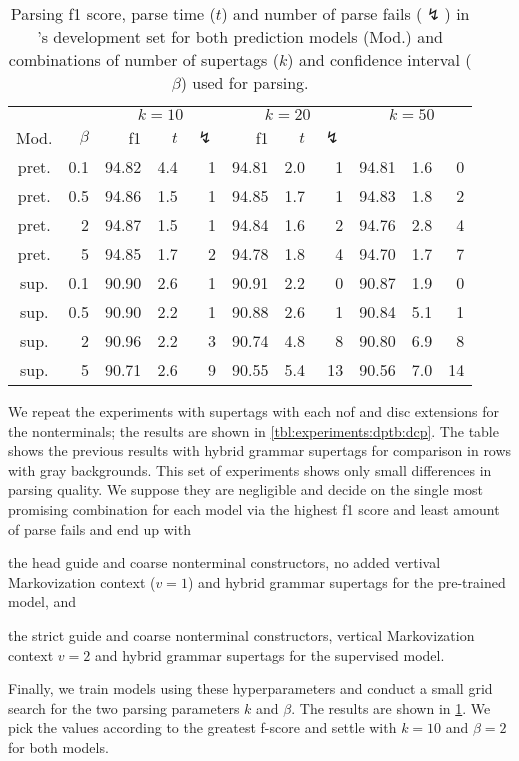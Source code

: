 \documentclass[../../document.tex]{subfiles}
\begin{document}
    \begin{table}
        \caption{\label{tbl:experiments:dptb:k}
        Parsing f1 score, parse time ($t$) and number of parse fails ($\lightning$) in \dptb{}'s development set for both prediction models (Mod.) and combinations of number of supertags ($k$) and confidence interval ($\beta$) used for parsing.
        }
        \centering
        \setlength{\tabcolsep}{4pt}
        \vspace{.2cm}
        \begin{tabular}{cr|rrr|rrr|rrr}
            \toprule
&     &       \multicolumn{3}{c|}{$k = 10$} & \multicolumn{3}{c|}{$k = 20$} & \multicolumn{3}{c}{$k = 50$} \\
Mod. &  $\beta$  & f1 & $t$ & $\lightning$ & f1 & $t$ & $\lightning$ \\ \hline
pret. & 0.1  & 94.82 & 4.4 & 1 & 94.81 & 2.0 & 1 & 94.81 & 1.6 & 0 \\
pret. & 0.5  & 94.86 & 1.5 & 1 & 94.85 & 1.7 & 1 & 94.83 & 1.8 & 2 \\
pret. &   2  & 94.87 & 1.5 & 1 & 94.84 & 1.6 & 2 & 94.76 & 2.8 & 4 \\
pret. &   5  & 94.85 & 1.7 & 2 & 94.78 & 1.8 & 4 & 94.70 & 1.7 & 7 \\
\midrule 
sup. & 0.1  & 90.90 & 2.6 & 1 & 90.91 & 2.2 &  0 & 90.87 & 1.9 &  0 \\
sup. & 0.5  & 90.90 & 2.2 & 1 & 90.88 & 2.6 &  1 & 90.84 & 5.1 &  1 \\
sup. &   2  & 90.96 & 2.2 & 3 & 90.74 & 4.8 &  8 & 90.80 & 6.9 &  8 \\
sup. &   5  & 90.71 & 2.6 & 9 & 90.55 & 5.4 & 13 & 90.56 & 7.0 & 14 \\
    \bottomrule
        \end{tabular}
    \end{table}

    We repeat the experiments with  supertags with each nof and disc extensions for the nonterminals; the results are shown in \cref{tbl:experiments:dptb:dcp}.
    The table shows the previous results with hybrid grammar supertags for comparison in rows with gray backgrounds.
    This set of experiments shows only small differences in parsing quality.
    We suppose they are negligible and decide on the single most promising combination for each model via the highest f1 score and least amount of parse fails and end up with
    \begin{compactitem}
        \item the head guide and coarse nonterminal constructors, no added vertival Markovization context ($v=1$) and hybrid grammar supertags for the pre-trained model, and
        \item the strict guide and coarse nonterminal constructors, vertical Markovization context \(v=2\) and hybrid grammar supertags for the supervised model.
    \end{compactitem}
    Finally, we train models using these hyperparameters and conduct a small grid search for the two parsing parameters \(k\) and \(\beta\). The results are shown in \cref{tbl:experiments:dptb:k}.
    We pick the values according to the greatest f-score and settle with \(k=10\) and \(\beta=2\) for both models.
\end{document}
